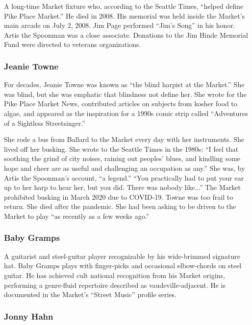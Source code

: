 \documentclass[11pt,letterpaper]{article}
\begin{document}
A long-time Market fixture who, according to the Seattle Times, ``helped define Pike Place Market.'' He died in 2008. His memorial was held inside the Market's main arcade on July 2, 2008. Jim Page performed ``Jim's Song'' in his honor. Artis the Spoonman was a close associate. Donations to the Jim Hinde Memorial Fund were directed to veterans organizations.

\subsubsection{Jeanie Towne}

For decades, Jeanie Towne was known as ``the blind harpist at the Market.'' She was blind, but she was emphatic that blindness not define her. She wrote for the Pike Place Market News, contributed articles on subjects from kosher food to algae, and appeared as the inspiration for a 1990s comic strip called ``Adventures of a Sightless Streetsinger.''

She rode a bus from Ballard to the Market every day with her instruments. She lived off her busking. She wrote to the Seattle Times in the 1980s: ``I feel that soothing the grind of city noises, raining out peoples' blues, and kindling some hope and cheer are as useful and challenging an occupation as any.'' She was, by Artis the Spoonman's account, ``a legend.'' ``You practically had to put your ear up to her harp to hear her, but you did. There was nobody like...'' The Market prohibited busking in March 2020 due to COVID-19. Towne was too frail to return. She died after the pandemic. She had been asking to be driven to the Market to play ``as recently as a few weeks ago.''

\subsubsection{Baby Gramps}

A guitarist and steel-guitar player recognizable by his wide-brimmed signature hat. Baby Gramps plays with finger-picks and occasional elbow-chords on steel guitar. He has achieved cult national recognition from his Market origins, performing a genre-fluid repertoire described as vaudeville-adjacent. He is documented in the Market's ``Street Music'' profile series.

\subsubsection{Jonny Hahn}
\end{document}
